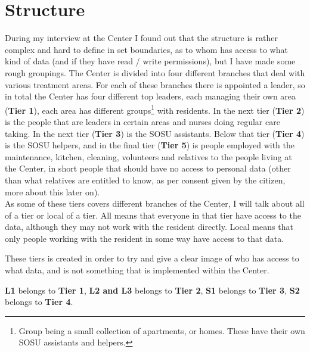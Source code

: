 \documentclass[11pt]{article}
\begin{document}
\section{Structure}
During my interview at the Center I found out that the structure is rather complex and hard to define in set boundaries, as to whom has access to what kind of data (and if they have read / write permissions), but I have made some rough groupings.
The Center is divided into four different branches that deal with various treatment areas. For each of these  branches there is appointed a leader, so in total the Center has four different top leaders, each managing their own area (\textbf{Tier 1}), each area has different groups\footnote{Group being a small collection of apartments, or homes. These have their own SOSU assistants and helpers.} with residents. In the next tier (\textbf{Tier 2}) is the people that are leaders in certain areas and nurses doing regular care taking. In the next tier (\textbf{Tier 3}) is the SOSU assistants. Below that tier (\textbf{Tier 4}) is the SOSU helpers, and in the final tier (\textbf{Tier 5}) is people employed with the maintenance, kitchen, cleaning, volunteers and relatives to the people living at the Center, in short people that should have no access to personal data (other than what relatives are entitled to know, as per consent given by the citizen, more about this later on).\\
As some of these tiers covers different branches of the Center, I will talk about all of a tier or local of a tier. All means that everyone in that tier have access to the data, although they may not work with the resident directly. Local means that only people working with the resident in some way have access to that data.

These tiers is created in order to try and give a clear image of who has access to what data, and is not something that is implemented within the Center.

\textbf{L1} belongs to \textbf{Tier 1}, \textbf{L2 and L3} belongs to \textbf{Tier 2}, \textbf{S1} belongs to \textbf{Tier 3}, \textbf{S2} belongs to \textbf{Tier 4}.
\end{document}
